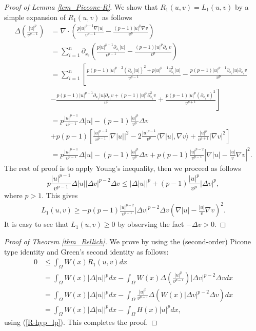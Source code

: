 \documentclass[a4paper,12pt,reqno]{amsart}
\renewcommand\eqref[1]{(\ref{#1})} %
\theoremstyle{theorem}
\numberwithin{equation}{section}
\theoremstyle{plain}
\theoremstyle{definition}
\theoremstyle{defi}
\begin{document}
\begin{proof}[Proof of Lemma \ref{lem_Piceone-R}]
	We show that $R_1(u,v)=L_1(u,v)$ by a simple expansion of $R_1(u,v)$ as follows 
	\begin{align*}
	\Delta\left( \frac{|u|^p}{v^{p-1}} \right) &= \nabla \cdot \left( \frac{p|u|^{p-1}\nabla|u| }{v^{p-1}} - \frac{(p-1)|u|^p\nabla v}{v^p} \right)\\
	& = \sum_{i=1}^{n} \partial_{x_i} \left( \frac{p|u|^{p-1} \partial_{x_i}|u| }{v^{p-1}} - \frac{(p-1)|u|^p \partial_{x_i} v}{v^p} \right)\\
	& =  \sum_{i=1}^{n} \left[ \frac{ p(p-1)|u|^{p-2}( \partial_{x_i}|u|)^2 + p|u|^{p-1}\partial_{x_i}^2|u|  }{v^{p-1}} - \frac{p(p-1) |u|^{p-1} \partial_{x_i}|u|\partial_{x_i}v }{v^{p}} \right.\\
	& - \left.  \frac{p(p-1)|u|^{p-1}\partial_{x_i}|u|\partial_{x_i} v + (p-1)|u|^p \partial_{x_i}^2v }{v^p} +  \frac{p(p-1)|u|^p (\partial_{x_i} v)^2}{v^{p+1}} \right] \\
	& = p \frac{|u|^{p-1}}{v^{p-1}}\Delta |u| - (p-1)\frac{|u|^p}{v^p}\Delta v \\
	& + p(p-1)\left[ \frac{|u|^{p-2}}{v^{p-1}} |\nabla |u||^2 -2 \frac{|u|^{p-1}}{v^p}\langle \nabla |u|, \nabla v\rangle + \frac{|u|^{p}}{v^{p+1}} |\nabla v|^2 \right]\\ 
	& =  p \frac{|u|^{p-1}}{v^{p-1}}\Delta |u| - (p-1)\frac{|u|^p}{v^p}\Delta v  + p(p-1) \frac{|u|^{p-2}}{v^{p-1}} \left| \nabla |u| - \frac{|u|}{v} \nabla v \right|^2.
	\end{align*}
	The rest of proof is to apply Young's inequality, then we proceed as follows
	\begin{equation*}
	p	\frac{|u|^{p-1}}{v^{p-1}} \Delta |u| |\Delta v|^{p-2} \Delta v \leq |\Delta |u||^p + (p-1) \frac{|u|^p}{v^p}|\Delta v|^p,
	\end{equation*}
	where $p>1$. This gives
	\begin{align*}
	L_1(u,v)\geq - p(p-1)\frac{|u|^{p-2}}{v^{p-1}} |\Delta v|^{p-2} \Delta v \left( \nabla |u| - \frac{|u|}{v} \nabla v\right)^2.
	\end{align*}
	It is easy to see that $L_1(u,v)\geq 0$ by observing the fact $-\Delta v >0$.	
\end{proof}
\begin{proof}[Proof of Theorem \ref{thm_Rellich}]
	We prove by using the (second-order) Picone type identity and Green's second identity as follows:
	\begin{align*}
	0 &\leq \int_{\Omega} W(x) R_1(u,v) dx \\
	& = \int_{\Omega} W(x) |\Delta |u||^p dx - \int_{\Omega} W(x) \Delta \left(\frac{|u|^p}{v^{p-1}}\right) |\Delta v|^{p-2} \Delta v dx \\
	& = \int_{\Omega} W(x) |\Delta |u||^p dx -\int_{\Omega} \frac{|u|^p}{v^{p-1}} \Delta (W(x)|\Delta v|^{p-2} \Delta v  ) dx\\
	& = \int_{\Omega} W(x) |\Delta |u||^p dx -\int_{\Omega} H(x) |u|^p dx,
	\end{align*}
	using \eqref{R-hyp_lp}. This completes the proof.
\end{proof}
\end{document}
